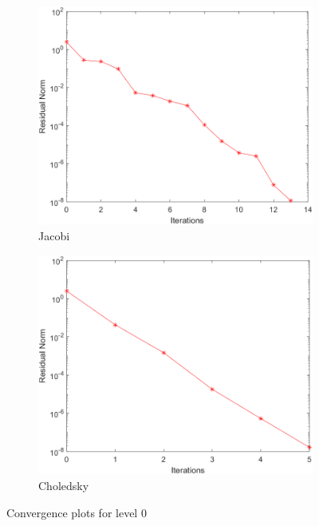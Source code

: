\documentclass[a4paper, 11pt]{article}
\begin{document}
				\begin{figure}[H]
					\begin{subfigure}{.49\textwidth}
						\centering
						\includegraphics[width=.99\linewidth]{img0/J.png}  
						\caption{Jacobi}
						\label{fig:Jacobi_0}
					\end{subfigure}
					\begin{subfigure}{.49\textwidth}
						\centering
						\includegraphics[width=.99\linewidth]{img0/C.png}  
						\caption{Choledsky}
						\label{fig:Chol_0}
					\end{subfigure}
					\caption{Convergence plots for level 0}
					\label{fig:fig0}
				\end{figure}
				
\end{document}
